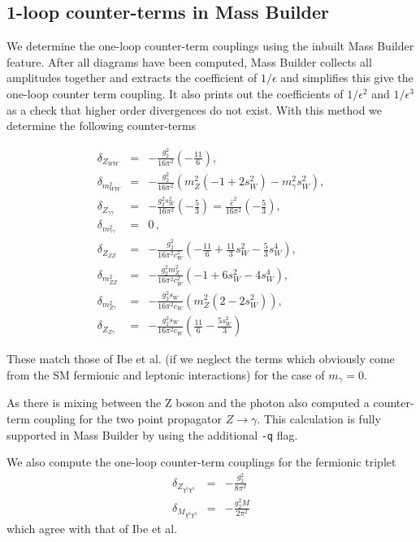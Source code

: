 \documentclass[11pt]{article}
\newcommand{\mb}{\textsf{Mass Builder} \! }
\begin{document}
\subsection{1-loop counter-terms in Mass Builder}

We determine the one-loop counter-term couplings using the inbuilt Mass Builder feature.  After all diagrams have been computed, Mass Builder collects all amplitudes together and extracts the coefficient of $1/\epsilon$ and simplifies this give the one-loop counter term coupling.  It also prints out the coefficients of $1/\epsilon^2$ and $1/\epsilon^3$ as a check that higher order divergences do not exist.  With this method we determine the following counter-terms


\begin{eqnarray}
\delta_{Z_{WW}} &=&- \frac{g_2^2}{16 \pi^2}\left(-\frac{11}{6}\right),\\
\delta_{m^2_{WW}}&=&- \frac{g_2^2}{16 \pi^2} \left( m^2_Z(-1+2s_W^2)     -m_{\gamma}^2s_W^2\right),\\
\delta_{Z_{\gamma\gamma}} &=&-\frac{g_2^2s_W^2}{16 \pi^2}\left(-\frac{5}{3}\right) = \frac{\hat{e}^2}{16\pi^2}\left(-\frac{5}{3}\right) , \\
\delta_{m^2_{\gamma\gamma}} &=& 0\, ,\\
\delta_{Z_{ZZ}} &=&-\frac{g_2^2}{16 \pi^2 c_W^2} \left(-\frac{11}{6}+\frac{11}{3}s_W^2-\frac{5}{3}s_W^4  \right),\\
\delta_{m^2_{ZZ}} &=& -\frac{g_2^2m_Z^2}{16 \pi^2c_W^2} \left(-1+6s_W^2-4s_W^4  \right),\\
\delta_{m^2_{Z\gamma}} &=& -\frac{g_2^2s_W}{16 \pi^2c_W} \left( m_Z^2(2-2s_W^2)  \right),\\
\delta_{Z_{Z\gamma}} &=& -\frac{g_2^2s_W}{16 \pi^2c_W} \left( \frac{11}{6}-\frac{5s_W^2}{3}  \right)
\end{eqnarray}

These match those of Ibe et al. (if we neglect the terms which obviously come from the SM fermionic and leptonic interactions) for the case of $m_{\gamma}=0$.

As there is mixing between the Z boson and the photon also computed a counter-term coupling for the two point propagator $Z\rightarrow\gamma$.  This calculation is fully supported in \mb by using the additional \lstinline{-q} flag.

We also compute the one-loop counter-term couplings for the fermionic triplet
\begin{eqnarray}
\delta_{Z_{\chi^0\chi^0}} &=&-\frac{g_2^2}{8 \pi^2}\\
\delta_{M_{\chi^0\chi^0}} &=&-\frac{g_2^2 M}{2 \pi^2}
\end{eqnarray}
which agree with that of Ibe et al.
\end{document}
